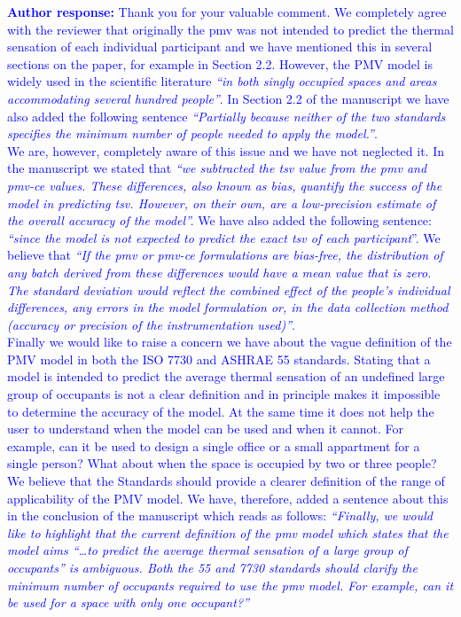 \documentclass[a4paper, 10pt]{letter}
\newcommand{\response}[1]{\textcolor{blue}{\textbf{Author response:} #1}}
\begin{document}
\begin{letter}
\begin{enumerate}
            \response{
                Thank you for your valuable comment.
                We completely agree with the reviewer that originally the \ac{pmv} was not intended to predict the thermal sensation of each individual participant and we have mentioned this in several sections on the paper, for example in Section 2.2.
                However, the PMV model is widely used in the scientific literature \textit{``in both singly occupied spaces and areas accommodating several hundred people''}.
                In Section 2.2 of the manuscript we have also added the following sentence \textit{``Partially because neither of the two standards specifies the minimum number of people needed to apply the model.''}.\\
                We are, however, completely aware of this issue and we have not neglected it.
                In the manuscript we stated that \textit{``we subtracted the \ac{tsv} value from the \ac{pmv} and \ac{pmv-ce} values.
                These differences, also known as bias, quantify the success of the model in predicting \ac{tsv}.
                However, on their own, are a low-precision estimate of the overall accuracy of the model''.}
                We have also added the following sentence: \textit{``since the model is not expected to predict the exact \ac{tsv} of each participant}''.
                We believe that \textit{``If the \ac{pmv} or \ac{pmv-ce} formulations are bias-free, the distribution of any batch derived from these differences would have a mean value that is zero.
                The standard deviation would reflect the combined effect of the people's individual differences, any errors in the model formulation or, in the data collection method (accuracy or precision of the instrumentation used)''}.\\
                Finally we would like to raise a concern we have about the vague definition of the PMV model in both the ISO 7730 and ASHRAE 55 standards.
                Stating that a model is intended to predict the average thermal sensation of an undefined large group of occupants is not a clear definition and in principle makes it impossible to determine the accuracy of the model.
                At the same time it does not help the user to understand when the model can be used and when it cannot.
                For example, can it be used to design a single office or a small appartment for a single person?
                What about when the space is occupied by two or three people?
                We believe that the Standards should provide a clearer definition of the range of applicability of the PMV model.
                We have, therefore, added a sentence about this in the conclusion of the manuscript which reads as follows: \textit{``Finally, we would like to highlight that the current definition of the \ac{pmv} model which states that the model aims ``\ldots to predict the average thermal sensation of a large group of occupants'' is ambiguous.
                Both the \gls{55} and \gls{7730} standards should clarify the minimum number of occupants required to use the \ac{pmv} model.
                For example, can it be used for a space with only one occupant?''}
            }


\end{enumerate}
\end{letter}
\end{document}

